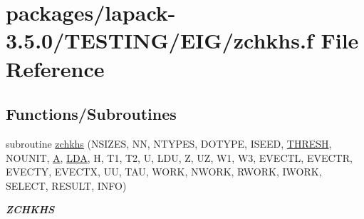 \hypertarget{zchkhs_8f}{}\section{packages/lapack-\/3.5.0/\+T\+E\+S\+T\+I\+N\+G/\+E\+I\+G/zchkhs.f File Reference}
\label{zchkhs_8f}
\subsection*{Functions/\+Subroutines}
\begin{DoxyCompactItemize}
\item 
subroutine \hyperlink{group__complex16__eig_ga427e9c206762384bc4e7b5bc787e6073}{zchkhs} (N\+S\+I\+Z\+E\+S, N\+N, N\+T\+Y\+P\+E\+S, D\+O\+T\+Y\+P\+E, I\+S\+E\+E\+D, \hyperlink{zlaqgs_8c_a0656018abfc9fa2821827415f5d5ea57}{T\+H\+R\+E\+S\+H}, N\+O\+U\+N\+I\+T, \hyperlink{classA}{A}, \hyperlink{example__user_8c_ae946da542ce0db94dced19b2ecefd1aa}{L\+D\+A}, H, T1, T2, U, L\+D\+U, Z, U\+Z, W1, W3, E\+V\+E\+C\+T\+L, E\+V\+E\+C\+T\+R, E\+V\+E\+C\+T\+Y, E\+V\+E\+C\+T\+X, U\+U, T\+A\+U, W\+O\+R\+K, N\+W\+O\+R\+K, R\+W\+O\+R\+K, I\+W\+O\+R\+K, S\+E\+L\+E\+C\+T, R\+E\+S\+U\+L\+T, I\+N\+F\+O)
\begin{DoxyCompactList}\small\item\em {\bfseries Z\+C\+H\+K\+H\+S} \end{DoxyCompactList}\end{DoxyCompactItemize}
